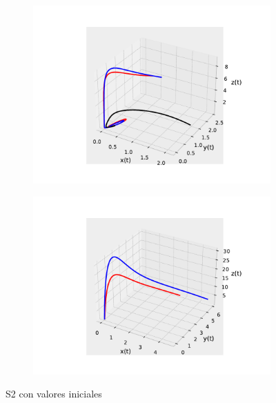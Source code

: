 \documentclass{wscpaperproc}
\theoremstyle{wsc}
\begin{document}
\begin{figure}[h]
	\centering
	\begin{subfigure}[b]{0.5\textwidth}
		\centering
		\includegraphics[width=\textwidth]{Simulations/S23d.pdf}
	
		\label{fig:comparativa91}
	\end{subfigure}%
	\begin{subfigure}[b]{0.5\textwidth}
		\centering
		\includegraphics[width=\textwidth]{Simulations/S13d.pdf}
		\label{fig:comparativa92}
	\end{subfigure}
	\caption{S2 con valores iniciales}

	\label{fig:comparacion8}
\end{figure}
\end{document}
